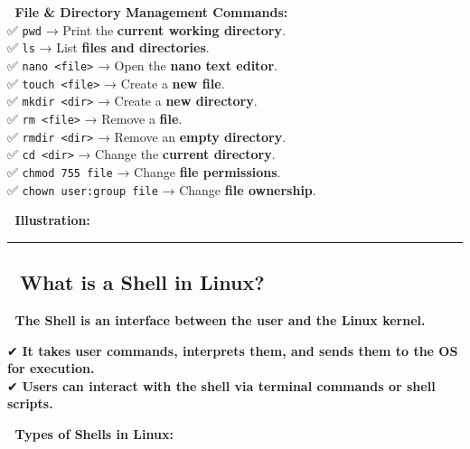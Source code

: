 \documentclass[
]{article}
\makeatletter
\newcommand*\pandocbounded[1]{%
  \sbox\pandoc@box{#1}%
  \Gscale@div\@tempa{\textheight}{\dimexpr\ht\pandoc@box+\dp\pandoc@box\relax}%
  \Gscale@div\@tempb{\linewidth}{\wd\pandoc@box}%
  \ifdim\@tempb\p@<\@tempa\p@\let\@tempa\@tempb\fi%
  \ifdim\@tempa\p@<\p@\scalebox{\@tempa}{\usebox\pandoc@box}%
  \else\usebox{\pandoc@box}%
  \fi%
}
\makeatother
\begin{document}
📌 \textbf{File \& Directory Management Commands:}\\
✅ \texttt{pwd} → Print the \textbf{current working directory}.\\
✅ \texttt{ls} → List \textbf{files and directories}.\\
✅ \texttt{nano\ \textless{}file\textgreater{}} → Open the \textbf{nano
text editor}.\\
✅ \texttt{touch\ \textless{}file\textgreater{}} → Create a \textbf{new
file}.\\
✅ \texttt{mkdir\ \textless{}dir\textgreater{}} → Create a \textbf{new
directory}.\\
✅ \texttt{rm\ \textless{}file\textgreater{}} → Remove a
\textbf{file}.\\
✅ \texttt{rmdir\ \textless{}dir\textgreater{}} → Remove an
\textbf{empty directory}.\\
✅ \texttt{cd\ \textless{}dir\textgreater{}} → Change the
\textbf{current directory}.\\
✅ \texttt{chmod\ 755\ file} → Change \textbf{file permissions}.\\
✅ \texttt{chown\ user:group\ file} → Change \textbf{file ownership}.

📌 \textbf{Illustration:}\\
\pandocbounded{\texttt{[image: Day\_2\_6.png]}}

\begin{center}\rule{0.5\linewidth}{0.5pt}\end{center}

\subsection{\texorpdfstring{\textbf{📌 What is a Shell in
Linux?}}{📌 What is a Shell in Linux?}}\label{what-is-a-shell-in-linux}

📌 \textbf{The Shell is an interface between the user and the Linux
kernel.}

✔ \textbf{It takes user commands, interprets them, and sends them to the
OS for execution.}\\
✔ \textbf{Users can interact with the shell via terminal commands or
shell scripts.}

📌 \textbf{Types of Shells in Linux:}
\end{document}
